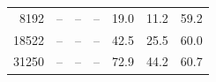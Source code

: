 \begin{tabular}{r | r r r | r r r}
          8192  &              --  &              --  &              --  &      \num{19.0}  &      \num{11.2}  &      \num{59.2} \\ 
         18522  &              --  &              --  &              --  &      \num{42.5}  &      \num{25.5}  &      \num{60.0} \\ 
         31250  &              --  &              --  &              --  &      \num{72.9}  &      \num{44.2}  &      \num{60.7} \\ 
\bottomrule
\end{tabular}
